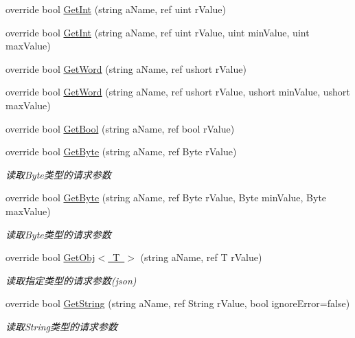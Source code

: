 \begin{DoxyCompactItemize}
override bool \mbox{\hyperlink{class_t_net_1_1_contract_1_1_http_get_afc5643a06ceca6ecba924888768a15c2}{Get\+Int}} (string a\+Name, ref uint r\+Value)
\item 
override bool \mbox{\hyperlink{class_t_net_1_1_contract_1_1_http_get_aecdcc5039a14e65f1b7caad8667fa212}{Get\+Int}} (string a\+Name, ref uint r\+Value, uint min\+Value, uint max\+Value)
\item 
override bool \mbox{\hyperlink{class_t_net_1_1_contract_1_1_http_get_a10445a4a1803e0e4f073282c9c4dd754}{Get\+Word}} (string a\+Name, ref ushort r\+Value)
\item 
override bool \mbox{\hyperlink{class_t_net_1_1_contract_1_1_http_get_a987ed559553d8e373939b6b97dc00dec}{Get\+Word}} (string a\+Name, ref ushort r\+Value, ushort min\+Value, ushort max\+Value)
\item 
override bool \mbox{\hyperlink{class_t_net_1_1_contract_1_1_http_get_a29c9882dfcb0ba5594dca751ae45efb0}{Get\+Bool}} (string a\+Name, ref bool r\+Value)
\item 
override bool \mbox{\hyperlink{class_t_net_1_1_contract_1_1_http_get_a4f28c7438a62cd67378d8558b8974a41}{Get\+Byte}} (string a\+Name, ref Byte r\+Value)
\begin{DoxyCompactList}\small\item\em 读取\+Byte类型的请求参数 \end{DoxyCompactList}\item 
override bool \mbox{\hyperlink{class_t_net_1_1_contract_1_1_http_get_a99dfa18e03bf43ac3dd539ea0d0f5ee6}{Get\+Byte}} (string a\+Name, ref Byte r\+Value, Byte min\+Value, Byte max\+Value)
\begin{DoxyCompactList}\small\item\em 读取\+Byte类型的请求参数 \end{DoxyCompactList}\item 
override bool \mbox{\hyperlink{class_t_net_1_1_contract_1_1_http_get_a85e072c6b60d00d34d9464916a62d6c7}{Get\+Obj$<$ T $>$}} (string a\+Name, ref T r\+Value)
\begin{DoxyCompactList}\small\item\em 读取指定类型的请求参数(json) \end{DoxyCompactList}\item 
override bool \mbox{\hyperlink{class_t_net_1_1_contract_1_1_http_get_ade64b775a2fe61cac8737571ab66d7e2}{Get\+String}} (string a\+Name, ref String r\+Value, bool ignore\+Error=false)
\begin{DoxyCompactList}\small\item\em 读取\+String类型的请求参数 \end{DoxyCompactList}\item 

\end{DoxyCompactItemize}
